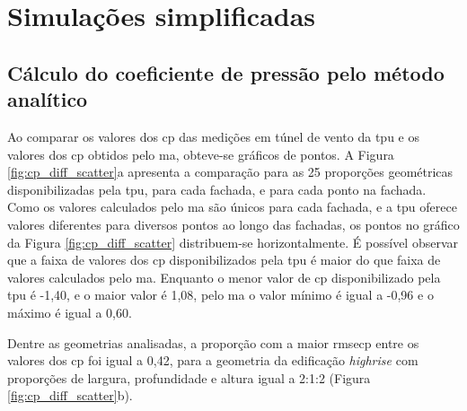 \documentclass[brazil,hardcopy,openany]{ufscthesis} %
\begin{document}
\section{Simulações simplificadas}

\subsection{Cálculo do coeficiente de pressão pelo método analítico}

Ao comparar os valores dos \acrfull{cp} das medições em túnel de vento da \acrfull{tpu} e os valores dos \acrshort{cp} obtidos pelo \acrlong{ma}, obteve-se gráficos de pontos. 
A Figura \ref{fig:cp_diff_scatter}a apresenta a comparação para as 25 proporções geométricas disponibilizadas pela \acrshort{tpu}, para cada fachada, e para cada ponto na fachada.
Como os valores calculados pelo \acrlong{ma} são únicos para cada fachada, e a \acrshort{tpu} oferece valores diferentes para diversos pontos ao longo das fachadas, os pontos no gráfico da Figura \ref{fig:cp_diff_scatter} distribuem-se horizontalmente. 
É possível observar que a faixa de valores dos \acrshort{cp} disponibilizados pela \acrshort{tpu} é maior do que  faixa de valores calculados pelo \acrlong{ma}. Enquanto o menor valor de \acrshort{cp} disponibilizado pela \acrshort{tpu} é \mbox{-1,40}, e o maior valor é 1,08, pelo \acrlong{ma} o valor mínimo é igual a -0,96 e o máximo é igual a 0,60.

Dentre as geometrias analisadas, a proporção com a maior \gls{rmsecp} entre os valores dos \acrshort{cp} foi igual a 0,42, para a geometria da edificação \textit{highrise} com proporções de largura, profundidade e altura igual a 2:1:2 (Figura \ref{fig:cp_diff_scatter}b).

\vspace{40pt}
\newpage
\end{document}
